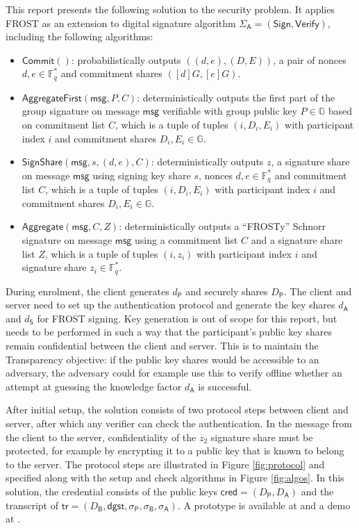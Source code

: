 \documentclass[a4paper]{article}
\begin{document}
This report presents the following solution to the security problem. It applies FROST \cite{cryptoeprint:2020/852} \cite{rfc9591} as an extension to digital signature algorithm $\Sigma_\mathsf A=(\mathsf{Sign},\mathsf{Verify})$, including the following algorithms:
\begin{itemize}
\item $\mathsf{Commit}()$: probabilistically outputs $((d,e),(D,E))$, a pair of nonces $d,e\in\mathbb F^*_q$ and commitment shares $([d]G,[e]G)$.
\item $\mathsf{AggregateFirst}(\mathsf{msg},P,C)$: deterministically outputs the first part of the group signature on message $\mathsf{msg}$ verifiable with group public key $P\in\mathbb G$ based on commitment list $C$, which is a tuple of tuples $(i,D_i,E_i)$ with participant index $i$ and commitment shares $D_i,E_i\in\mathbb G$.
\item $\mathsf{SignShare}(\mathsf{msg},s,(d,e),C)$: deterministically outputs $z$, a signature share on message $\mathsf{msg}$ using signing key share $s$, nonces $d,e\in\mathbb F^*_q$ and commitment list $C$, which is a tuple of tuples $(i,D_i,E_i)$ with participant index $i$ and commitment shares $D_i,E_i\in\mathbb G$.
\item $\mathsf{Aggregate}(\mathsf{msg},C,Z)$: deterministically outputs a “FROSTy” Schnorr signature on message $\mathsf{msg}$ using a commitment list $C$ and a signature share list $Z$, which is a tuple of tuples $(i,z_i)$ with participant index $i$ and signature share $z_i\in\mathbb F^*_q$.
\end{itemize}

During enrolment, the client generates $d_\mathsf{P}$ and securely shares $D_\mathsf{P}$. The client and server need to set up the authentication protocol and generate the key shares $d_\mathsf{A}$ and $d_\mathsf{S}$ for FROST signing. Key generation is out of scope for this report, but needs to be performed in such a way that the participant’s public key shares remain confidential between the client and server. This is to maintain the Transparency objective: if the public key shares would be accessible to an adversary, the adversary could for example use this to verify offline whether an attempt at guessing the knowledge factor $d_\mathsf{A}$ is successful.

After initial setup, the solution consists of two protocol steps between client and server, after which any verifier can check the authentication. In the message from the client to the server, confidentiality of the $z_2$ signature share must be protected, for example by encrypting it to a public key that is known to belong to the server. The protocol steps are illustrated in Figure \ref{fig:protocol} and specified along with the setup and check algorithms in Figure \ref{fig:algos}. In this solution, the credential consists of the public keys $\mathsf{cred}=(D_\mathsf P,D_\mathsf A)$ and the transcript of $\mathsf{tr}=(D_\mathsf{B},\mathsf{dgst},\sigma_\mathsf P,\sigma_\mathsf B,\sigma_\mathsf A)$. A prototype is available at \cite{SCAL3} and a demo at \cite{demo}.
\end{document}
